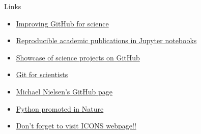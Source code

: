 \documentclass[compress,red]{beamer}\usetheme{Warsaw}\useoutertheme[subsection=false]{smoothbars}
\begin{document}
\begin{frame}{Links}
\begin{itemize}
\item \href{https://github.com/blog/1840-improving-github-for-science}{Improving GitHub for science}

\item \href{https://github.com/ipython/ipython/wiki/A-gallery-of-interesting-IPython-Notebooks\#reproducible-academic-publications}{Reproducible academic publications in Jupyter notebooks}

\item \href{https://github.com/showcases/science}{Showcase of science projects on GitHub}

\item \href{http://nyuccl.org/pages/gittutorial/}{Git for scientists}

\item \href{https://github.com/mnielsen}{Michael Nielsen's GitHub page}

\item \href{http://www.nature.com/news/programming-pick-up-python-1.16833}{Python promoted in Nature}

\item \href{http://icons.icfo.eu/}{Don't forget to visit ICONS webpage!!}
\end{itemize}
\end{frame}
\end{document}
